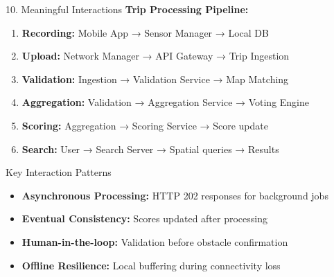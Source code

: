 \documentclass[aspectratio=169, 10pt]{beamer}
\begin{document}
\begin{frame}{10. Meaningful Interactions}
    \textbf{Trip Processing Pipeline:}
    
    \vspace{0.3cm}
    \begin{enumerate}
        \item \textbf{Recording:} Mobile App → Sensor Manager → Local DB
        \item \textbf{Upload:} Network Manager → API Gateway → Trip Ingestion
        \item \textbf{Validation:} Ingestion → Validation Service → Map Matching
        \item \textbf{Aggregation:} Validation → Aggregation Service → Voting Engine
        \item \textbf{Scoring:} Aggregation → Scoring Service → Score update
        \item \textbf{Search:} User → Search Server → Spatial queries → Results
    \end{enumerate}
    
    \vspace{0.3cm}
    \begin{block}{Key Interaction Patterns}
        \begin{itemize}
            \item \textbf{Asynchronous Processing:} HTTP 202 responses for background jobs
            \item \textbf{Eventual Consistency:} Scores updated after processing
            \item \textbf{Human-in-the-loop:} Validation before obstacle confirmation
            \item \textbf{Offline Resilience:} Local buffering during connectivity loss
        \end{itemize}
    \end{block}
\end{frame}
\end{document}
